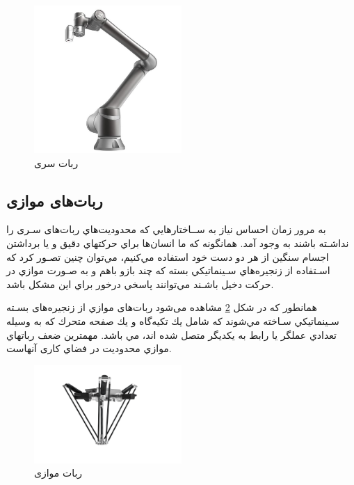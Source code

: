 \begin{figure}[H]
	\centering
	\includegraphics[width=0.5\textwidth]{./images/Chapter1/TechmanTM12}	
	\caption[ربات سری]{ربات سری \cite{SerialRobot}}
	\label{ربات سریال}
\end{figure}
\noindent
\unskip

\subsection{ربات‌های موازی}

به مرور زمان احساس نیاز به ســاختارهايي كه محدوديت‌هاي ربات‌های سـری را نداشـته باشند به وجود آمد. همانگونه كه ما انسان‌ها براي حركتهاي دقيق و يا برداشتن اجسام سنگين از هر دو دست خود استفاده مي‌كنيم، مي‌توان چنين تصـور كرد كه اسـتفاده از زنجيره‌هاي سـينماتيكي بسته كه چند بازو باهم و به صـورت موازي در حركت دخيل باشـند مي‌توانند پاسخي درخور براي اين مشكل باشد. 

همانطور که در شکل
\ref{ربات موازی}
مشاهده می‌شود ربات‌های موازي از زنجيره‌های بسـته سـينماتيكي سـاخته مي‌شوند كه شامل يك تكيه‌گاه
\noindent\unskip{}
و يك صفحه متحرك
\noindent\unskip{}
كه به وسيله تعدادي عملگر يا رابط به يكديگر متصل شده اند، مي باشد. مهمترين ضعف رباتهاي موازي محدوديت در فضاي كاری آنهاست. 
\begin{figure}[H]
	\centering
	\includegraphics[width=0.5\textwidth]{./images/Chapter1/Delta2}	
	\caption[ربات موازی]{ربات موازی \cite{ParallelRobot}}
	\label{ربات موازی}
\end{figure}
\noindent
\unskip


